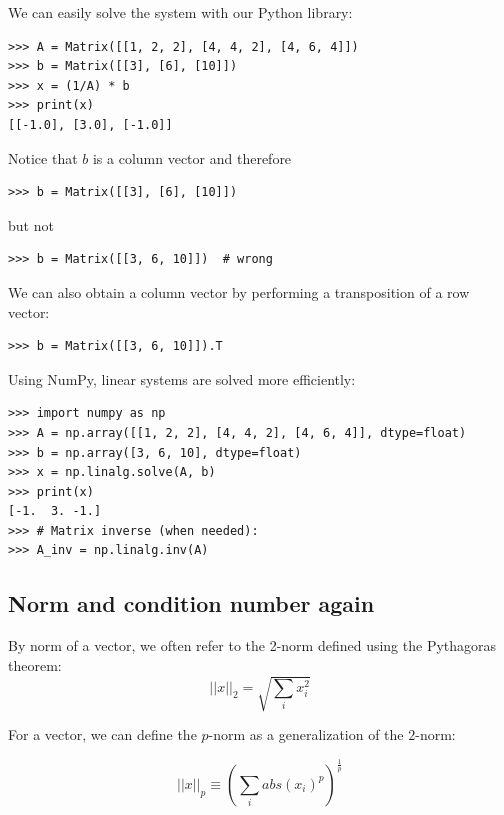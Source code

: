 \documentclass[justified, sixbynine]{tufte-book}
\def\ft{\small\tt}
\theoremstyle{plain}%
\newtheorem * {corollary}{Corollary}
\theoremstyle{definition}
\theoremstyle{remark}
\newtheorem * {remark}{Remark}
\newtheorem * {note}{Note}
\begin{document}
\begin{fullwidth}
We can easily solve the system with our Python library:

\begin{lstlisting}[caption={in file: {\ft nlib.py}}]
>>> A = Matrix([[1, 2, 2], [4, 4, 2], [4, 6, 4]])
>>> b = Matrix([[3], [6], [10]])
>>> x = (1/A) * b
>>> print(x)
[[-1.0], [3.0], [-1.0]]
\end{lstlisting}

Notice that $b$ is a column vector and therefore

\begin{lstlisting}
>>> b = Matrix([[3], [6], [10]])
\end{lstlisting}

but not

\begin{lstlisting}
>>> b = Matrix([[3, 6, 10]])  # wrong
\end{lstlisting}

We can also obtain a column vector by performing a transposition of a row vector:

\begin{lstlisting}
>>> b = Matrix([[3, 6, 10]]).T
\end{lstlisting}

Using NumPy, linear systems are solved more efficiently:

\begin{lstlisting}
>>> import numpy as np
>>> A = np.array([[1, 2, 2], [4, 4, 2], [4, 6, 4]], dtype=float)
>>> b = np.array([3, 6, 10], dtype=float)
>>> x = np.linalg.solve(A, b)
>>> print(x)
[-1.  3. -1.]
>>> # Matrix inverse (when needed):
>>> A_inv = np.linalg.inv(A)
\end{lstlisting}

\goodbreak\subsection{Norm and condition number again}


By norm of a vector, we often refer to the 2-norm defined using the Pythagoras theorem:
\begin{equation}
||x||_2 = \sqrt{\sum_i x_i^2}
\end{equation}

For a vector, we can define the $p$-norm as a generalization of the $2$-norm:

\begin{equation}
||x||_p \equiv \left(\sum_i abs(x_i)^p \right)^{\frac1p}
\end{equation}


\end{fullwidth}
\end{document}
